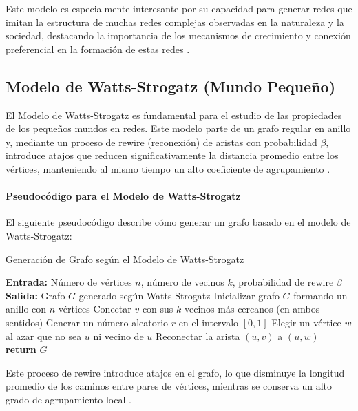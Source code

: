 Este modelo es especialmente interesante por su capacidad para generar redes que imitan la estructura de muchas redes complejas observadas en la naturaleza y la sociedad, destacando la importancia de los mecanismos de crecimiento y conexión preferencial en la formación de estas redes .
\subsection{Modelo de Watts-Strogatz (Mundo Pequeño)}

El Modelo de Watts-Strogatz es fundamental para el estudio de las propiedades de los pequeños mundos en redes. Este modelo parte de un grafo regular en anillo y, mediante un proceso de rewire (reconexión) de aristas con probabilidad $\beta$, introduce atajos que reducen significativamente la distancia promedio entre los vértices, manteniendo al mismo tiempo un alto coeficiente de agrupamiento \citep{Watts1998} .

\paragraph{Pseudocódigo para el Modelo de Watts-Strogatz}

El siguiente pseudocódigo describe cómo generar un grafo basado en el modelo de Watts-Strogatz:

\begin{algorithm}
\caption{Generación de Grafo según el Modelo de Watts-Strogatz}
\begin{algorithmic}[1]
\State \textbf{Entrada:} Número de vértices $n$, número de vecinos $k$, probabilidad de rewire $\beta$
\State \textbf{Salida:} Grafo $G$ generado según Watts-Strogatz
    \State Inicializar grafo $G$ formando un anillo con $n$ vértices
        \State Conectar $v$ con sus $k$ vecinos más cercanos (en ambos sentidos)
    \EndFor
        \State Generar un número aleatorio $r$ en el intervalo $[0, 1]$
            \State Elegir un vértice $w$ al azar que no sea $u$ ni vecino de $u$
            \State Reconectar la arista $(u, v)$ a $(u, w)$
        \EndIf
    \EndFor
    \State \textbf{return} $G$
\EndProcedure
\end{algorithmic}
\end{algorithm}

Este proceso de rewire introduce atajos en el grafo, lo que disminuye la longitud promedio de los caminos entre pares de vértices, mientras se conserva un alto grado de agrupamiento local .

